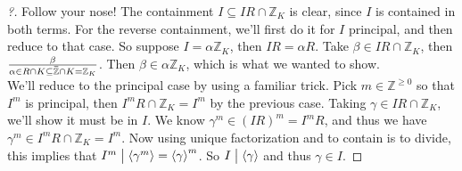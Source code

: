 \begin{proof}[?]

Follow your nose! The containment \(I \subseteq IR \cap{\mathbb{Z}}_K\)
is clear, since \(I\) is contained in both terms. For the reverse
containment, we'll first do it for \(I\) principal, and then reduce to
that case. So suppose \(I = \alpha {\mathbb{Z}}_K\), then
\(IR = \alpha R\). Take \(\beta \in IR \cap{\mathbb{Z}}_K\), then
\(\beta\over \alpha \in R \cap K \subseteq \mkern 1.5mu\overline{\mkern-1.5mu{\mathbb{Z}}\mkern-1.5mu}\mkern 1.5mu\cap K = {\mathbb{Z}}_K\).
Then \(\beta \in \alpha {\mathbb{Z}}_K\), which is what we wanted to
show.\\

We'll reduce to the principal case by using a familiar trick. Pick
\(m\in {\mathbb{Z}}^{\geq 0}\) so that \(I^m\) is principal, then
\(I^m R \cap{\mathbb{Z}}_K = I^m\) by the previous case. Taking
\(\gamma\in IR \cap{\mathbb{Z}}_K\), we'll show it must be in \(I\). We
know \(\gamma^m \in (IR)^m = I^m R\), and thus we have
\(\gamma^m \in I^m R \cap{\mathbb{Z}}_K = I^m\). Now using unique
factorization and to contain is to divide, this implies that
\(I^m \bigm|\left\langle{ \gamma ^m }\right\rangle= \left\langle{ \gamma }\right\rangle^m\).
So \(I \bigm|\left\langle{ \gamma }\right\rangle\) and thus
\(\gamma \in I\).

\end{proof}

